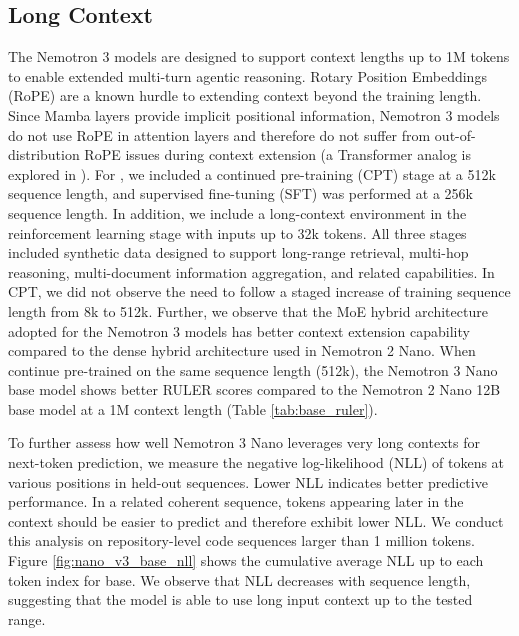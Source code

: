 \subsection{Long Context}
\label{subsec:lc}

The Nemotron 3 models are designed to support context lengths up to 1M tokens to enable extended multi-turn agentic reasoning. Rotary Position Embeddings (RoPE) are a known hurdle to extending context beyond the training length. Since Mamba layers provide implicit positional information, Nemotron 3 models do not use RoPE in attention layers and therefore do not suffer from out-of-distribution RoPE issues during context extension (a Transformer analog is explored in \cite{puvvada-etal-2025-swan}). For \ourmodel, we included a continued pre-training (CPT) stage at a 512k sequence length, and supervised fine-tuning (SFT) was performed at a 256k sequence length. In addition, we include a long-context environment in the reinforcement learning stage with inputs up to 32k tokens. All three stages included synthetic data designed to support long-range retrieval, multi-hop reasoning, multi-document information aggregation, and related capabilities. In CPT, we did not observe the need to follow a staged increase of training sequence length from 8k to 512k. Further, we observe that the MoE hybrid architecture adopted for the Nemotron 3 models has better context extension capability compared to the dense hybrid architecture used in Nemotron 2 Nano. When continue pre-trained on the same sequence length (512k), the Nemotron 3 Nano base model shows better RULER \citep{hsieh2024ruler} scores compared to the Nemotron 2 Nano 12B base model at a 1M context length (Table \ref{tab:base_ruler}).

To further assess how well Nemotron 3 Nano leverages very long contexts for next-token prediction, we measure the negative log-likelihood (NLL) of tokens at various positions in held-out sequences. Lower NLL indicates better predictive performance. In a related coherent sequence, tokens appearing later in the context should be easier to predict and therefore exhibit lower NLL. We conduct this analysis on repository-level code sequences larger than 1 million tokens. Figure \ref{fig:nano_v3_base_nll} shows the cumulative average NLL up to each token index for \ourmodel base. We observe that NLL decreases with sequence length, suggesting that the model is able to use long input context up to the tested range.

